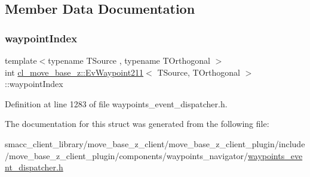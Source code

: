 \subsection{Member Data Documentation}
\mbox{\label{structcl__move__base__z_1_1EvWaypoint211_a6e15337060cce2a09aee80515f57ab2f}} 
\subsubsection{\texorpdfstring{waypoint\+Index}{waypointIndex}}
{\footnotesize\ttfamily template$<$typename T\+Source , typename T\+Orthogonal $>$ \\
int \hyperlink{structcl__move__base__z_1_1EvWaypoint211}{cl\+\_\+move\+\_\+base\+\_\+z\+::\+Ev\+Waypoint211}$<$ T\+Source, T\+Orthogonal $>$\+::waypoint\+Index}



Definition at line 1283 of file waypoints\+\_\+event\+\_\+dispatcher.\+h.



The documentation for this struct was generated from the following file\+:\begin{DoxyCompactItemize}
\item 
smacc\+\_\+client\+\_\+library/move\+\_\+base\+\_\+z\+\_\+client/move\+\_\+base\+\_\+z\+\_\+client\+\_\+plugin/include/move\+\_\+base\+\_\+z\+\_\+client\+\_\+plugin/components/waypoints\+\_\+navigator/\hyperlink{waypoints__event__dispatcher_8h}{waypoints\+\_\+event\+\_\+dispatcher.\+h}\end{DoxyCompactItemize}
